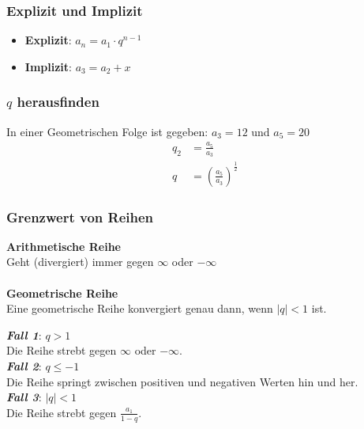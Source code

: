 \subsubsection{Explizit und Implizit}
\begin{itemize}
	\item \textbf{Explizit}: $a_n = a_1 \cdot q^{n-1}$
	\item \textbf{Implizit}: $a_{3} = a_2 + x$
\end{itemize}

\subsubsection{$q$ herausfinden}
In einer Geometrischen Folge ist gegeben: $a_3 = 12$ und $a_5 = 20$\\
\begin{align*}
	q_2 & = \frac{a_5}{a_3}\\
	q & = (\frac{a_5}{a_3})^{\frac{1}{2}}
\end{align*}


\subsubsection{Grenzwert von Reihen}
\textbf{Arithmetische Reihe}\\
Geht (divergiert) immer gegen $\infty$ oder $-\infty$
\\
\\
\textbf{Geometrische Reihe}\\
Eine geometrische Reihe konvergiert genau dann, wenn $|q| < 1$ ist.
\begin{flushleft}
    \textit{\textbf{Fall 1}}: $q > 1$ \\
    Die Reihe strebt gegen $\infty$ oder $-\infty$. \\[0.5em]
    \textit{\textbf{Fall 2}}: $q \leq -1$ \\
    Die Reihe springt zwischen positiven und negativen Werten hin und her. \\[0.5em]
    \textit{\textbf{Fall 3}}: $|q| < 1$ \\
    Die Reihe strebt gegen $\frac{a_1}{1-q}$.
\end{flushleft}
